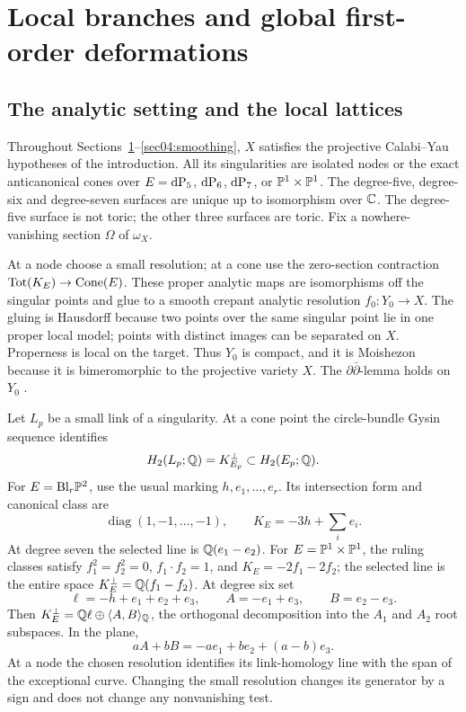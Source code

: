 \section{Local branches and global first-order deformations}
\label{sec:deformation}

\subsection{The analytic setting and the local lattices}
Throughout Sections~\ref{sec:deformation}--\ref{sec04:smoothing}, $X$
satisfies the projective Calabi--Yau hypotheses of the introduction.
All its singularities are isolated nodes or the exact anticanonical
cones over $E=\mathrm{dP}_5$, $\mathrm{dP}_6$, $\mathrm{dP}_7$, or $\mathbb{P}^1\times\mathbb{P}^1$.
The degree-five, degree-six and degree-seven surfaces are unique up
to isomorphism over $\mathbb{C}$.  The degree-five surface is not toric;
the other three surfaces are toric.  Fix a nowhere-vanishing
section $\Omega$ of $\omega_X$.

At a node choose a small resolution; at a cone use the zero-section
contraction $\operatorname{Tot}(K_E)\to\operatorname{Cone}(E)$.  These proper analytic
maps are isomorphisms off the singular points and glue to a smooth
crepant analytic resolution $f_0:Y_0\to X$.  The gluing is Hausdorff
because two points over the same singular point lie in one proper
local model; points with distinct images can be separated on $X$.
Properness is local on the target.  Thus $Y_0$ is compact, and it is
Moishezon because it is bimeromorphic to the projective variety $X$.
The $\partial\bar\partial$-lemma holds on $Y_0$
\cite[Thm.~5.22 and Cor.~5.23]{dgms1975}.

Let $L_p$ be a small link of a singularity.  At a cone point the
circle-bundle Gysin sequence identifies
\[
 H_2(L_p;\mathbb{Q})=K_{E_p}^{\perp}\subset H_2(E_p;\mathbb{Q}).
\]
For $E=\mathrm{Bl}_r\mathbb{P}^2$, use the usual marking $h,e_1,\ldots,e_r$.
Its intersection form and canonical class are
\[
 \operatorname{diag}(1,-1,\ldots,-1),\qquad K_E=-3h+\sum_i e_i.
\]
At degree seven the selected line is
$\mathbb{Q}(e_1-e_2)$.  For $E=\mathbb{P}^1\times\mathbb{P}^1$, the ruling classes
satisfy $f_1^2=f_2^2=0$, $f_1\cdot f_2=1$, and
$K_E=-2f_1-2f_2$; the selected line is the entire space
$K_E^\perp=\mathbb{Q}(f_1-f_2)$.  At degree six set
\begin{equation}\label{eq:rootcoordinates}
 \ell=-h+e_1+e_2+e_3,\qquad A=-e_1+e_3,\qquad B=e_2-e_3.
\end{equation}
Then $K_E^\perp=\mathbb{Q}\ell\oplus\langle A,B\rangle_{\mathbb{Q}}$, the orthogonal
decomposition into the $A_1$ and $A_2$ root subspaces.  In the plane,
\begin{equation}\label{eq:a2coefficients}
 aA+bB=-a e_1+b e_2+(a-b)e_3.
\end{equation}
At a node the chosen resolution identifies its link-homology line
with the span of the exceptional curve.  Changing the small resolution
changes its generator by a sign and does not change any nonvanishing test.

